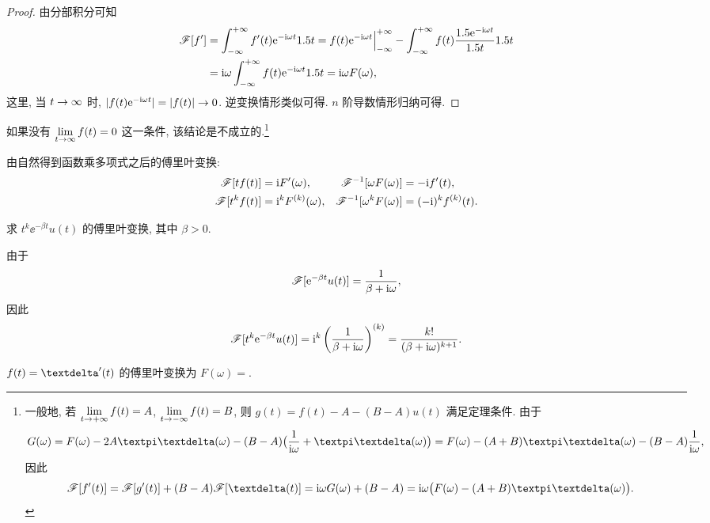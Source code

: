 \begin{proof}
  由分部积分可知
  \begin{align*}
    \mathscr{F}[f']
    &=\displaystyle\int_{-\infty}^{+\infty} f'(t)\mathrm{e}^{-\mathrm{i} \omega t}1.5 t
    =f(t)\mathrm{e}^{-\mathrm{i} \omega t}\Big|_{-\infty}^{+\infty}-\displaystyle\int_{-\infty}^{+\infty} f(t)\frac{1.5 \mathrm{e}^{-\mathrm{i} \omega t}}{1.5 t}1.5 t\\
    &=\mathrm{i} \omega \displaystyle\int_{-\infty}^{+\infty} f(t)\mathrm{e}^{-\mathrm{i} \omega t}1.5 t
    =\mathrm{i} \omega F(\omega),
  \end{align*}
  这里, 当 $t\rightarrow \infty$ 时, $\lvert f(t)\mathrm{e}^{-\mathrm{i}\omega t}\rvert=\lvert f(t)\rvert\rightarrow 0$.
  逆变换情形类似可得.
  $n$ 阶导数情形归纳可得.
\end{proof}

如果没有 $\lim\limits_{t\rightarrow\infty}f(t)=0$ 这一条件, 该结论是不成立的.\footnote{
  一般地, 若 $\lim\limits_{t\rightarrow+\infty}f(t)=A$, $\lim\limits_{t\rightarrow-\infty}f(t)=B$, 则 $g(t)=f(t)-A-(B-A)u(t)$ 满足定理条件.
  由于
  \[
    G(\omega)
    =F(\omega)-2A\cpi\dirac(\omega)-(B-A)\bigl(\frac1{\ii \omega}+\cpi\dirac(\omega)\bigr)
    =F(\omega)-(A+B)\cpi\dirac(\omega)-(B-A)\frac1{\ii \omega},
  \]
  因此
  \begin{align*}
    \msf[f'(t)]
    &=\msf[g'(t)]+(B-A)\msf[\dirac(t)]
    =\ii \omega G(\omega)+(B-A)
    =\ii \omega \bigl(F(\omega)-(A+B)\cpi\dirac(\omega)\bigr).
  \end{align*}
}

由\thmFDif 自然得到函数乘多项式之后的傅里叶变换:
\begin{align*}
  \mathscr{F}[tf(t)]&=\mathrm{i} F'(\omega),&
  \mathscr{F}^{-1}[\omega F(\omega)]&=-\mathrm{i} f'(t),\\
  \mathscr{F}[t^kf(t)]&=\mathrm{i}^kF^{(k)}(\omega),&
  \mathscr{F}^{-1}[\omega^kF(\omega)]&=(-\mathrm{i} )^kf^{(k)}(t).
\end{align*}

\begin{example}\label{exam:fourier-transform-power-rational}
  求 $t^k \ee^{-\beta t}u(t)$ 的傅里叶变换, 其中 $\beta>0$.
\end{example}

\begin{solution}
  由于
  \[
    \mathscr{F}[\mathrm{e}^{-\beta t}u(t)]=\frac{1}{\beta+\mathrm{i} \omega},
  \]
  因此
  \[
    \mathscr{F}[t^k\mathrm{e}^{-\beta t}u(t)]=\mathrm{i}^k\left(\frac1{\beta+\mathrm{i} \omega}\right)^{(k)}
    =\frac{k!}{(\beta+\mathrm{i} \omega)^{k+1}}.
  \]
\end{solution}

\begin{exercise}
  $f(t)=\dirac'(t)$ 的傅里叶变换为 $F(\omega)=$\fillblank{}.
\end{exercise}

